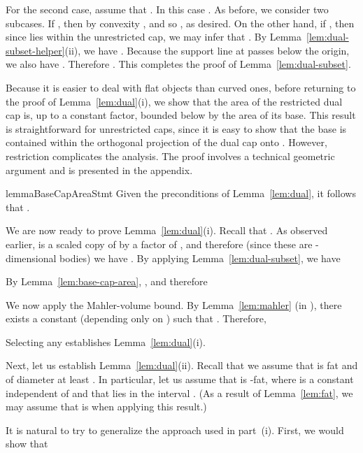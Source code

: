 \documentclass[11pt]{article}   \usepackage[letterpaper,hmargin=2.1cm,vmargin=3cm]{geometry}
\begin{document}
For the second case, assume that . In this case . As before, we consider two subcases. If , then by convexity , and so , as desired. On the other hand, if , then since  lies within the unrestricted cap, we may infer that . By Lemma~\ref{lem:dual-subset-helper}(ii), we have . Because the support line at  passes below the origin, we also have . Therefore . This completes the proof of Lemma~\ref{lem:dual-subset}.

\medskip

Because it is easier to deal with flat objects than curved ones, before returning to the proof of Lemma~\ref{lem:dual}(i), we show that the area of the restricted dual cap is, up to a constant factor, bounded below by the area of its base. This result is straightforward for unrestricted caps, since it is easy to show that the base is contained within the orthogonal projection of the dual cap onto . However, restriction complicates the analysis. The proof involves a technical geometric argument and is presented in the appendix.

\begin{restatable}{lemma}{BaseCapAreaStmt}\label{lem:base-cap-area}
Given the preconditions of Lemma~\ref{lem:dual}, it follows that .
\end{restatable}


\medskip

We are now ready to prove Lemma~\ref{lem:dual}(i). Recall that . As observed earlier,  is a scaled copy of  by a factor of , and therefore (since these are -dimensional bodies) we have . By applying Lemma~\ref{lem:dual-subset}, we have

By Lemma~\ref{lem:base-cap-area}, , and therefore

We now apply the Mahler-volume bound. By Lemma~\ref{lem:mahler} (in ), there exists a constant  (depending only on ) such that . Therefore,

Selecting any  establishes Lemma~\ref{lem:dual}(i).

\bigskip

Next, let us establish Lemma~\ref{lem:dual}(ii). Recall that we assume that  is fat and of diameter at least . In particular, let us assume that  is -fat, where  is a constant independent of  and  that lies in the interval . (As a result of Lemma~\ref{lem:fat}, we may assume that  is  when applying this result.)

It is natural to try to generalize the approach used in part~(i). First, we would show that 
\end{document}
